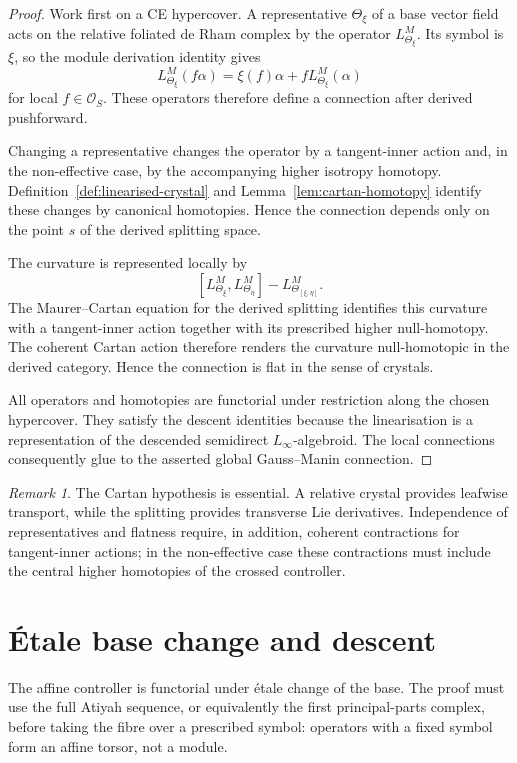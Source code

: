 \documentclass[11pt,reqno,a4paper,dvipsnames,x11names]{amsart}
\numberwithin{equation}{section}
\theoremstyle{plain}
\theoremstyle{definition}
\theoremstyle{remark}
\newtheorem{remark}[theorem]{Remark}
\newcommand{\cO}{\mathcal{O}}
\begin{document}
\begin{proof}
Work first on a CE hypercover. A representative \(\Theta_\xi\) of a base vector field acts on the relative foliated de Rham complex by the operator
\(L^M_{\Theta_\xi}\). Its symbol is \(\xi\), so the module derivation identity gives
\[
 L^M_{\Theta_\xi}(f\alpha)
 =\xi(f)\alpha+fL^M_{\Theta_\xi}(\alpha)
\]
for local \(f\in\cO_S\). These operators therefore define a connection after derived pushforward.

Changing a representative changes the operator by a tangent-inner action and, in the non-effective case, by the accompanying higher isotropy homotopy. Definition~\ref{def:linearised-crystal} and Lemma~\ref{lem:cartan-homotopy} identify these changes by canonical homotopies. Hence the connection depends only on the point \(s\) of the derived splitting space.

The curvature is represented locally by
\[
 [L^M_{\Theta_\xi},L^M_{\Theta_\eta}]
 -L^M_{\Theta_{[\xi,\eta]}}.
\]
The Maurer--Cartan equation for the derived splitting identifies this curvature with a tangent-inner action together with its prescribed higher null-homotopy. The coherent Cartan action therefore renders the curvature null-homotopic in the derived category. Hence the connection is flat in the sense of crystals.

All operators and homotopies are functorial under restriction along the chosen hypercover. They satisfy the descent identities because the linearisation is a representation of the descended semidirect \(L_\infty\)-algebroid. The local connections consequently glue to the asserted global Gauss--Manin connection.
\end{proof}

\begin{remark}
The Cartan hypothesis is essential. A relative crystal provides leafwise transport, while the splitting provides transverse Lie derivatives. Independence of representatives and flatness require, in addition, coherent contractions for tangent-inner actions; in the non-effective case these contractions must include the central higher homotopies of the crossed controller.
\end{remark}


\section{\'Etale base change and descent}\label{sec:base-change}

The affine controller is functorial under \'etale change of the base. The proof must use the full Atiyah sequence, or equivalently the first principal-parts complex, before taking the fibre over a prescribed symbol: operators with a fixed symbol form an affine torsor, not a module.
\end{document}
